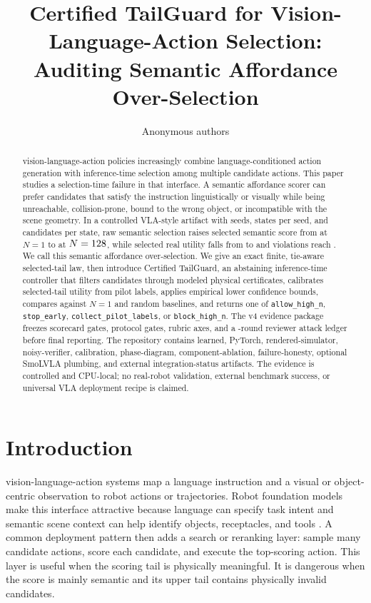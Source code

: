 \documentclass{article}
\title{Certified TailGuard for Vision-Language-Action Selection: Auditing Semantic Affordance Over-Selection}
\author{Anonymous authors}
\newcommand{\method}{Certified TailGuard}
\newcommand{\vla}{vision-language-action}
\newcommand{\sao}{semantic affordance over-selection}
\begin{document}
\maketitle

\begin{abstract}
\vla{} policies increasingly combine language-conditioned action generation with inference-time selection among multiple candidate actions. This paper studies a selection-time failure in that interface. A semantic affordance scorer can prefer candidates that satisfy the instruction linguistically or visually while being unreachable, collision-prone, bound to the wrong object, or incompatible with the scene geometry. In a controlled VLA-style artifact with \VThreeSeeds{} seeds, \VThreeStatesPerSeed{} states per seed, and \VThreeCandidateBudget{} candidates per state, raw semantic selection raises selected semantic score from \VThreeLearnedRawNOneSem{} at $N=1$ to \VThreeLearnedRawHighSem{} at $N=128{}$, while selected real utility falls from \VThreeLearnedRawNOneUtil{} to \VThreeLearnedRawHighUtil{} and violations reach \VThreeLearnedRawHighViol{}. We call this \sao{}. We give an exact finite, tie-aware selected-tail law, then introduce \method{}, an abstaining inference-time controller that filters candidates through modeled physical certificates, calibrates selected-tail utility from pilot labels, applies empirical lower confidence bounds, compares against $N=1$ and random baselines, and returns one of \texttt{allow\_high\_n}, \texttt{stop\_early}, \texttt{collect\_pilot\_labels}, or \texttt{block\_high\_n}. The v4 evidence package freezes \VFourScorecardRows{} scorecard gates, \VFourProtocolGates{} protocol gates, \VFourRubricAxes{} rubric axes, and a \VFourAttackRounds{}-round reviewer attack ledger before final reporting. The repository contains learned, PyTorch, rendered-simulator, noisy-verifier, calibration, phase-diagram, component-ablation, failure-honesty, optional SmoLVLA plumbing, and external integration-status artifacts. The evidence is controlled and CPU-local; no real-robot validation, external benchmark success, or universal VLA deployment recipe is claimed.
\end{abstract}

\section{Introduction}

\vla{} systems map a language instruction and a visual or object-centric observation to robot actions or trajectories. Robot foundation models make this interface attractive because language can specify task intent and semantic scene context can help identify objects, receptacles, and tools \citep{ahn2022saycan,brohan2022rt1,brohan2023rt2,kim2024openvla}. A common deployment pattern then adds a search or reranking layer: sample many candidate actions, score each candidate, and execute the top-scoring action. This layer is useful when the scoring tail is physically meaningful. It is dangerous when the score is mainly semantic and its upper tail contains physically invalid candidates.
\end{document}
